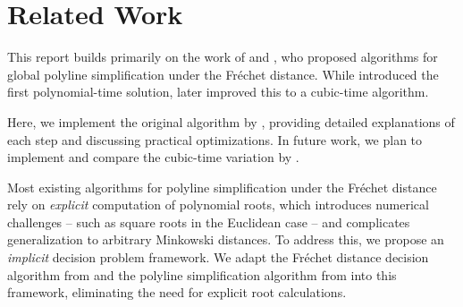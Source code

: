\section{Related Work}
\label{sec:related_work}
This report builds primarily on the work of \citeauthor{polyline_simplification_has_cubic_complexity_bringmannetal}
and \citeauthor{on_optimal_polyline_simplification_using_the_hausdorff_and_frechet_distance}, who proposed algorithms for global polyline simplification under the Fréchet distance.
While \citeauthor{on_optimal_polyline_simplification_using_the_hausdorff_and_frechet_distance} introduced the first polynomial-time solution, \citeauthor{polyline_simplification_has_cubic_complexity_bringmannetal} later improved this to a cubic-time algorithm.

Here, we implement the original algorithm by \citeauthor{on_optimal_polyline_simplification_using_the_hausdorff_and_frechet_distance}, providing detailed explanations of each step and discussing practical optimizations. 
In future work, we plan to implement and compare the cubic-time variation by \citeauthor{polyline_simplification_has_cubic_complexity_bringmannetal}. 

Most existing algorithms for polyline simplification under the Fréchet distance rely on \emph{explicit} computation of polynomial roots, which introduces numerical challenges -- such as square roots in the Euclidean case -- and complicates generalization to arbitrary Minkowski distances. To address this, we propose an \emph{implicit} decision problem framework. We adapt the Fréchet distance decision algorithm from \citeauthor{computing_the_frechet_distance_between_two_polygonal_curves} and the polyline simplification algorithm from \citeauthor{on_optimal_polyline_simplification_using_the_hausdorff_and_frechet_distance} into this framework, eliminating the need for explicit root calculations.
